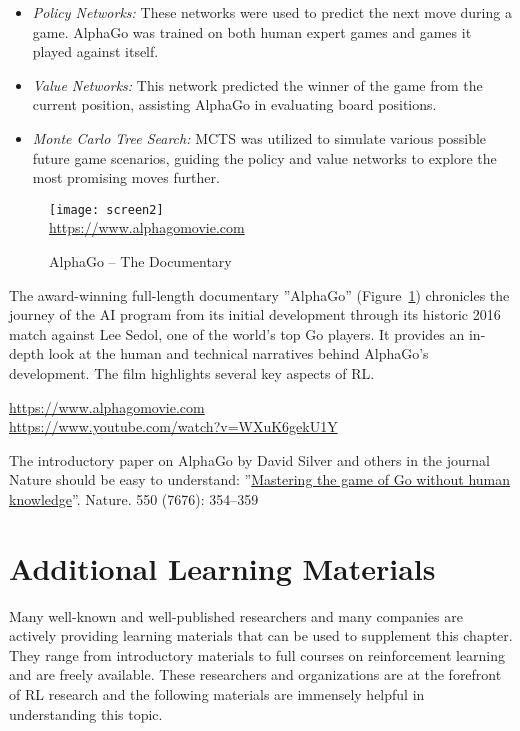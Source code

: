 \begin{itemize}
\item \emph{Policy Networks:} These networks were used to predict the next move during a game. AlphaGo was trained on both human expert games and games it played against itself.
\item \emph{Value Networks:} This network predicted the winner of the game from the current position, assisting AlphaGo in evaluating board positions.
\item \emph{Monte Carlo Tree Search:} MCTS was utilized to simulate various possible future game scenarios, guiding the policy and value networks to explore the most promising moves further.
\end{itemize}

\begin{figure}
\begin{center}
\texttt{[image: screen2]} \\
\footnotesize \url{https://www.alphagomovie.com}
\end{center}
\caption{AlphaGo -- The Documentary}
\label{fig:alphago}
\end{figure}

The award-winning full-length documentary ''AlphaGo'' (Figure~\ref{fig:alphago}) chronicles the journey of the AI program from its initial development through its historic 2016 match against Lee Sedol, one of the world's top Go players. It provides an in-depth look at the human and technical narratives behind AlphaGo's development. The film highlights several key aspects of RL.

\begin{tcolorbox}[colback=code]
\small
\url{https://www.alphagomovie.com} \\

\url{https://www.youtube.com/watch?v=WXuK6gekU1Y}
\normalsize
\end{tcolorbox}

The introductory paper on AlphaGo by David Silver and others in the journal Nature should be easy to understand: ''\href{https://www.nature.com/articles/nature24270}{Mastering the game of Go without human knowledge}''. Nature. 550 (7676): 354--359

\section{Additional Learning Materials}

Many well-known and well-published researchers and many companies are actively providing learning materials that can be used to supplement this chapter. They range from introductory materials to full courses on reinforcement learning and are freely available. These researchers and organizations are at the forefront of RL research and the following materials are immensely helpful in understanding this topic.

